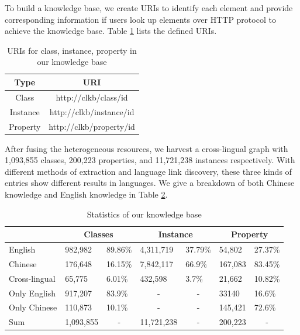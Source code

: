 \documentclass[runningheads,a4paper]{llncs}
\begin{document}
To build a knowledge base, we create URIs to identify each element and provide corresponding information if users look up elements over HTTP protocol to achieve the knowledge base. Table \ref{tab:uris} lists the defined URIs.
\begin{table}[h]
\small
\centering
\caption{URIs for class, instance, property in our knowledge base}
\label{tab:uris}
    \begin{tabular}{|c|c|}
        \hline
        Type     & URI                     \\ \hline
        Class  & http://clkb/class/id  \\ \hline
        Instance & http://clkb/instance/id \\ \hline
        Property & http://clkb/property/id \\ \hline
    \end{tabular}
\end{table}

After fusing the heterogeneous resources, we harvest a cross-lingual graph with 1,093,855 classes, 200,223 properties, and 11,721,238 instances respectively. With different methods of extraction and language link discovery, these three kinds of entries show different results in languages. We give a breakdown of both Chinese knowledge and English knowledge in Table \ref{tab:kb-result}.

\begin{table}[h]
\small
\centering
\caption{Statistics of our knowledge base}
\label{tab:kb-result}
\begin{tabular}{|l|l|l|l|l|l|l|}
\hline
\multicolumn{1}{|c|}{} & \multicolumn{2}{c|}{Classes}      & \multicolumn{2}{c|}{Instance}                   & \multicolumn{2}{c|}{Property}    \\ \hline
English                & 982,982   & 89.86\%                & 4,311,719              & 37.79\%                & 54,802  & 27.37\%                \\ \hline
Chinese                & 176,648   & 16.15\%                & 7,842,117              & 66.9\%                 & 167,083 & 83.45\%                \\ \hline
Cross-lingual          & 65,775    & 6.01\%                 & 432,598                & 3.7\%                  & 21,662  & 10.82\%                \\ \hline
Only English           & 917,207   & 83.9\%                 & \multicolumn{1}{c|}{-} & \multicolumn{1}{c|}{-} & 33140   & 16.6\%                 \\ \hline
Only Chinese           & 110,873   & 10.1\%                 & \multicolumn{1}{c|}{-} & \multicolumn{1}{c|}{-} & 145,421 & 72.6\%                 \\ \hline
Sum                    & 1,093,855 & \multicolumn{1}{c|}{-} & 11,721,238             & \multicolumn{1}{c|}{-} & 200,223 & \multicolumn{1}{c|}{-} \\ \hline
\end{tabular}
\end{table}
\end{document}

